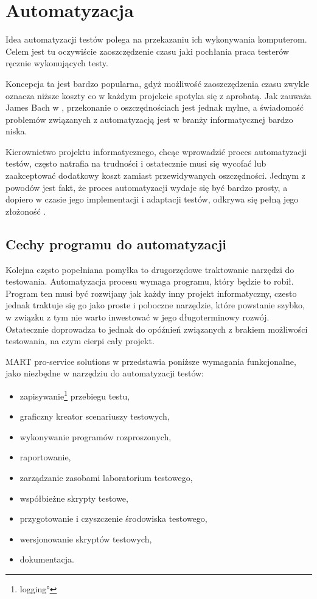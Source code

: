 \documentclass[00-praca-magisterska.tex]{subfiles}
\begin{document}
\chapter{Automatyzacja}
\label{automatyzacja}

Idea automatyzacji testów polega na przekazaniu ich wykonywania komputerom.
Celem jest tu oczywiście zaoszczędzenie czasu jaki pochłania praca testerów
ręcznie wykonujących testy.

Koncepcja ta jest bardzo popularna, gdyż możliwość zaoszczędzenia czasu zwykle
oznacza niższe koszty co w każdym projekcie spotyka się z aprobatą. Jak zauważa
James Bach w \cite{snake-oil}, przekonanie o oszczędnościach jest jednak mylne,
a świadomość problemów związanych z automatyzacją jest w branży informatycznej
bardzo niska.

Kierownictwo projektu informatycznego, chcąc wprowadzić proces automatyzacji
testów, często natrafia na trudności i ostatecznie musi się wycofać lub
zaakceptować dodatkowy koszt zamiast przewidywanych oszczędności. Jednym z
powodów jest fakt, że proces automatyzacji wydaje się być bardzo prosty, a
dopiero w czasie jego implementacji i adaptacji testów, odkrywa się pełną jego
złożoność \cite{automation-fail}.

\section{Cechy programu do automatyzacji}

Kolejna często popełniana pomyłka to drugorzędowe traktowanie narzędzi do
testowania. Automatyzacja procesu wymaga programu, który będzie to robił.
Program ten musi być rozwijany jak każdy inny projekt informatyczny, czesto
jednak traktuje się go jako proste i poboczne narzędzie, które powstanie
szybko, w związku z tym nie warto inwestować w jego długoterminowy rozwój.
Ostatecznie doprowadza to jednak do opóźnień związanych z brakiem możliwości
testowania, na czym cierpi cały projekt.  

MART pro-service solutions w \cite{automation-fail} przedstawia poniższe
wymagania funkcjonalne, jako niezbędne w narzędziu do automatyzacji testów:
\begin{itemize}
\item zapisywanie\footnote{\ang{logging}} przebiegu testu,
\item graficzny kreator scenariuszy testowych,
\item wykonywanie programów rozproszonych,
\item raportowanie,
\item zarządzanie zasobami laboratorium testowego,
\item współbieżne skrypty testowe,
\item przygotowanie i czyszczenie środowiska testowego,
\item wersjonowanie skryptów testowych,
\item dokumentacja.
\end{itemize}
\end{document}
